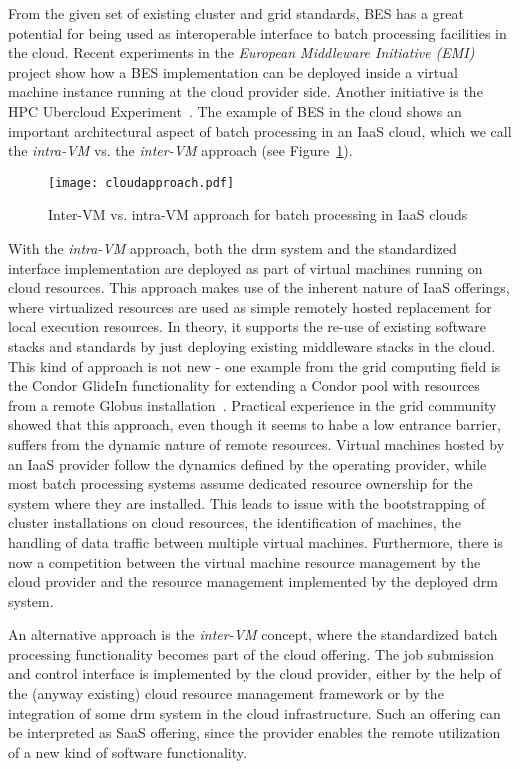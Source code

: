 \documentclass[twocolumn]{svjour3}       %
\begin{document}
From the given set of existing cluster and grid standards, BES has a great potential for being used as interoperable interface to batch processing facilities in the cloud. Recent experiments in the \emph{European Middleware Initiative (EMI)} project show how a BES implementation can be deployed inside a virtual machine instance running at the cloud provider side. Another initiative is the HPC Ubercloud Experiment~\cite{citemaster_9647}. The example of BES in the cloud shows an important architectural aspect of batch processing in an IaaS cloud, which we call the \emph{intra-VM} vs. the \emph{inter-VM} approach (see Figure~\ref{fig:vmapproach}).  

\begin{figure}
  \texttt{[image: cloudapproach.pdf]}
\caption{Inter-VM vs. intra-VM approach for batch processing in IaaS clouds}
\label{fig:vmapproach} 
\end{figure}


With the \emph{intra-VM} approach, both the \gls{drm} system and the standardized interface implementation are deployed as part of virtual machines running on cloud resources. This approach makes use of the inherent nature of IaaS offerings, where virtualized resources are used as simple remotely hosted replacement for local execution resources. In theory, it supports the re-use of existing software stacks and standards by just deploying existing middleware stacks in the cloud. This kind of approach is not new - one example from the grid computing field is the Condor GlideIn functionality for extending a Condor pool with resources from a remote Globus installation~\cite{condorgrid}. Practical experience in the grid community showed that this approach, even though it seems to habe a low entrance barrier, suffers from the dynamic nature of remote resources. Virtual machines hosted by an IaaS provider follow the dynamics defined by the operating provider, while most batch processing systems assume dedicated resource ownership for the system where they are installed. This leads to issue with the bootstrapping of cluster installations on cloud resources, the identification of machines, the handling of data traffic between multiple virtual machines. Furthermore, there is now a competition between the virtual machine resource management by the cloud provider and the resource management implemented by the deployed \gls{drm} system.

An alternative approach is the \emph{inter-VM} concept, where the standardized batch processing functionality becomes part of the cloud offering. The job submission and control interface is implemented by the cloud provider, either by the help of the (anyway existing) cloud resource management framework or by the integration of some \gls{drm} system in the cloud infrastructure. Such an offering can be interpreted as SaaS offering, since the provider enables the remote utilization of a new kind of software functionality.
\end{document}
